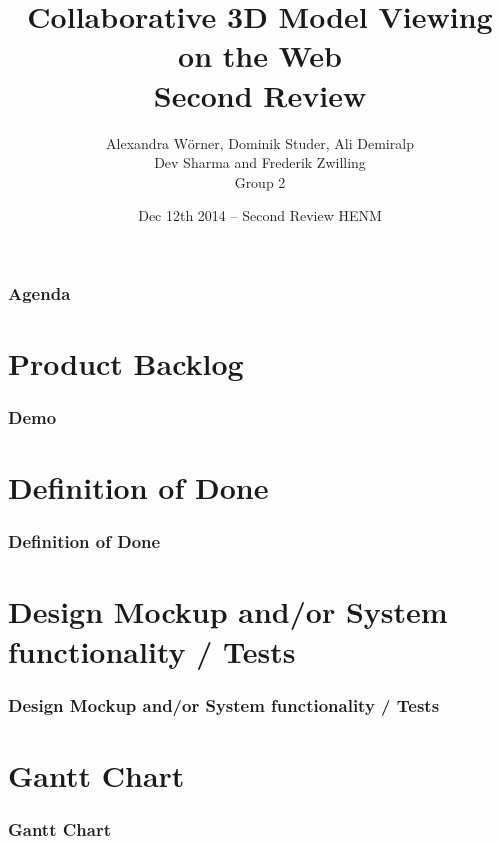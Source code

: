 

\title[Collaborative 3D Model Viewing on the Web]{Collaborative 3D Model Viewing on the Web\\ Second Review}
\author[Group 2]{%
  Alexandra Wörner, Dominik Studer, Ali Demiralp\\ Dev Sharma and Frederik Zwilling \\
  \bigskip
  {\scriptsize Group 2}
}

\date[Dec 12th 2014 @ HENM 2014]{Dec 12th 2014 -- Second Review HENM}



\frame[plain]{\titlepage}
\addtocounter{framenumber}{-1}

\begin{frame}
  \frametitle{Agenda}
  \tableofcontents[hideallsubsections]
\end{frame}

\section{Product Backlog}

\begin{frame}
  \frametitle{Demo}
\end{frame}

\section{Definition of Done}

\begin{frame}
  \frametitle{Definition of Done}
\end{frame}

\section{Design Mockup and/or System functionality / Tests}

\begin{frame}
  \frametitle{Design Mockup and/or System functionality / Tests}
\end{frame}

\section{Gantt Chart}

\begin{frame}
  \frametitle{Gantt Chart}
\end{frame}

